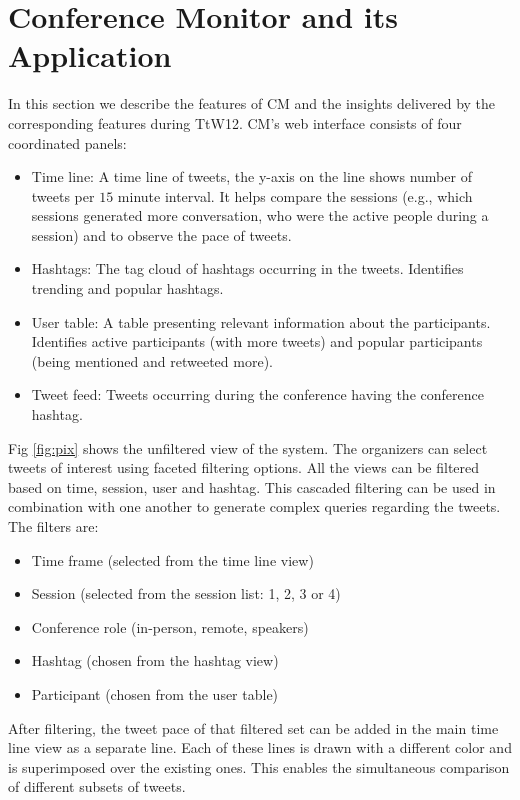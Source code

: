 \documentclass[conference,final]{IEEEtran}
\begin{document}
\section{Conference Monitor and its Application} 
In this section we describe the features of CM and the insights delivered by the corresponding features during TtW12. CM's web interface consists of four coordinated panels: 
\begin{itemize}
	  \item Time line: A time line of tweets, the y-axis on the line shows number of tweets per $15$ minute interval. It helps compare the sessions (e.g., which sessions generated more conversation, who were the active people during a session) and to observe the pace of tweets.
		\item Hashtags: The tag cloud of hashtags occurring in the tweets. Identifies trending and popular hashtags.
		\item User table: A table presenting relevant information about the participants. Identifies active participants (with more tweets) and popular participants (being mentioned and retweeted more).
	  \item Tweet feed: Tweets occurring during the conference having the conference hashtag. 
\end{itemize}

Fig \ref{fig:pix} shows the unfiltered view of the system. The organizers can select tweets of interest using faceted filtering options. All the views can be filtered based on time, session, user and hashtag. This cascaded filtering can be used in combination with one another to generate complex queries regarding the tweets. The filters are:
 
\begin{itemize}
\item Time frame (selected from the time line view)
\item Session (selected from the session list: 1, 2, 3 or 4)
\item Conference role (in-person, remote, speakers)
\item Hashtag (chosen from the  hashtag view)
\item Participant (chosen from the user table)
\end{itemize}

After filtering, the tweet pace of that filtered set can be added in the main time line view as a separate line. Each of these lines is drawn with a different color and is superimposed over the existing ones. This enables the simultaneous comparison of different subsets of tweets.
\end{document}
